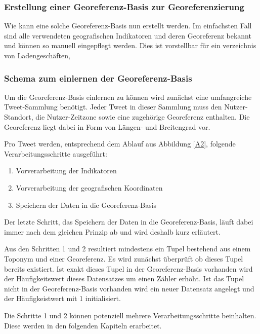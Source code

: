			\subsubsection{Erstellung einer Georeferenz-Basis zur Georeferenzierung}

				Wie kann eine solche Georeferenz-Basis nun erstellt werden.
				Im einfachsten Fall sind alle verwendeten geografischen Indikatoren und deren Georeferenz bekannt und können so manuell eingepflegt werden.
				Dies ist vorstellbar für ein verzeichnis von Ladengeschäften,   

			\subsubsection{Schema zum einlernen der Georeferenz-Basis}



				Um die Georeferenz-Basis einlernen zu können wird zunächst eine umfangreiche Tweet-Sammlung benötigt.
				Jeder Tweet in dieser Sammlung muss den Nutzer-Standort, die Nutzer-Zeitzone sowie eine zugehörige Georeferenz enthalten.
				Die Georeferenz liegt dabei in Form von Längen- und Breitengrad vor. 
				
				Pro Tweet werden, entsprechend dem Ablauf aus Abbildung \ref{A2}, folgende Verarbeitungsschritte ausgeführt:

				\begin{enumerate}
					\item Vorverarbeitung der Indikatoren
					\item Vorverarbeitung der geografischen Koordinaten
					\item Speichern der Daten in die Georeferenz-Basis
				\end{enumerate}

				Der letzte Schritt, das Speichern der Daten in die Georeferenz-Basis, läuft dabei immer nach dem gleichen Prinzip ab und wird deshalb kurz erläutert.
				
				Aus den Schritten 1 und 2 resultiert mindestens ein Tupel bestehend aus einem Toponym und einer Georeferenz. 
				Es wird zunächst überprüft ob dieses Tupel bereits existiert.
				Ist exakt dieses Tupel in der Georeferenz-Basis vorhanden wird der Häufigkeitswert dieses Datensatzes um einen Zähler erhöht.
				Ist das Tupel nicht in der Georeferenz-Basis vorhanden wird ein neuer Datensatz angelegt und der Häufigkeistwert mit 1 initialisiert.

				Die Schritte 1 und 2 können potenziell mehrere Verarbeitungsschritte beinhalten. 
				Diese werden in den folgenden Kapiteln erarbeitet. 





